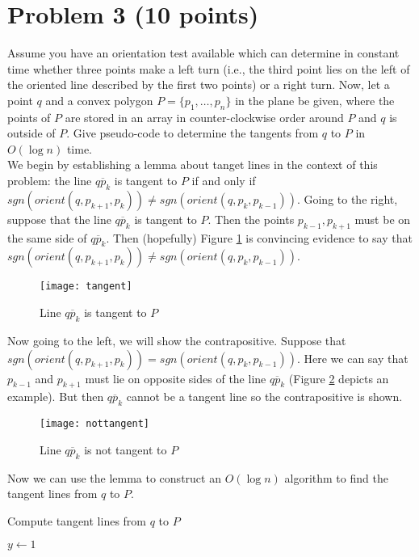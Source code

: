 \documentclass[11pt]{article}
\begin{document}
\section*{Problem 3 (10 points)}

Assume you have an orientation test available which can determine in constant
time whether three points make a left turn (i.e., the third point lies on the
left of the oriented line described by the first two points) or a right turn.
Now, let a point $q$ and a convex polygon $P = \{ p_1, \ldots , p_n \}$ in the
plane be given, where the points of $P$ are stored in an array in
counter-clockwise order around $P$ and $q$ is outside of $P$. Give pseudo-code
to determine the tangents from $q$ to $P$ in $O(\log n)$ time. \\

\answer
We begin by establishing a lemma about tanget lines in the context of this problem: the line $\overline{qp_k}$ is tangent to $P$ if and only if $sgn(orient(q, p_{k+1}, p_k)) \neq sgn(orient(q, p_k, p_{k-1}))$.
Going to the right, suppose that the line $\overline{qp_k}$ is tangent to $P$.
Then the points $p_{k-1}, p_{k+1}$ must be on the same side of $\overline{q p_k}$.
Then (hopefully) Figure \ref{fig:tangent} is convincing evidence to say that $sgn(orient(q, p_{k+1}, p_k)) \neq sgn(orient(q, p_k, p_{k-1}))$.

\begin{figure}[h]
    \centering
    \texttt{[image: tangent]}
    \caption{Line $\overline{q p_k}$ is tangent to $P$}
    \label{fig:tangent}
\end{figure}

Now going to the left, we will show the contrapositive.
Suppose that $sgn(orient(q, p_{k+1}, p_k)) = sgn(orient(q, p_k, p_{k-1}))$.
Here we can say that $p_{k-1}$ and $p_{k+1}$ must lie on opposite sides of the line $\overline{q p_k}$ (Figure \ref{fig:nottangent} depicts an example).
But then $\overline{q p_k}$ cannot be a tangent line so the contrapositive is shown.

\begin{figure}[h]
    \centering
    \texttt{[image: nottangent]}
    \caption{Line $\overline{q p_k}$ is not tangent to $P$}
    \label{fig:nottangent}
\end{figure}

Now we can use the lemma to construct an $O(\log n)$ algorithm to find the tangent lines from $q$ to $P$.

\begin{algorithm}
    \caption{Compute tangent lines from $q$ to $P$}
    \begin{algorithmic}
        \STATE $y \gets 1$
    \end{algorithmic}
\end{algorithm}
\end{document}
